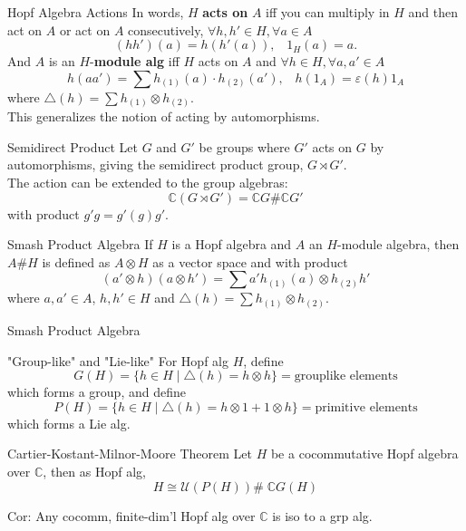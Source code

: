 \documentclass{beamer}
\newcommand\1{_{(1)}}
\newcommand\2{_{(2)}}
\begin{document}
\begin{frame}{Hopf Algebra Actions}
In words, $H$ \textbf{acts on} $A$ iff you can multiply in $H$ and then act on $A$ or act on $A$ consecutively, $\forall h,h'\in H,\forall a\in A$
\[
(hh')(a)=h(h'(a)),\;\;\; 1_H(a)=a. 
\]
And $A$ is an $H$-\textbf{module alg} iff $H$ acts on $A$ and $\forall h\in H,\forall a,a'\in A$
\[
h(aa')=\sum h\1(a)\cdot h\2(a'),\;\;\; h(1_A)=\varepsilon(h)1_A    
\]
where $\triangle(h)=\sum h\1\otimes h\2$.
\\ This generalizes the notion of acting by automorphisms.

\end{frame}

\begin{frame}{Semidirect Product}
    Let $G$ and $G'$ be groups where $G'$ acts on $G$ by automorphisms, giving the semidirect product group, $G\rtimes G'$.\\
    The action can be extended to the group algebras:
    \[
    \mathbb{C}(G\rtimes G')=\mathbb{C}G\#\mathbb{C}G'    
    \]
    with product $g'g=g'(g)g'$.\\
    \begin{block}{Smash Product Algebra}
        If $H$ is a Hopf algebra and $A$ an $H$-module algebra, then $A\#H$ is defined as $A\otimes H$ as a vector space and with product
        \[
        (a'\otimes h)(a\otimes h')=\sum a'h\1(a)\otimes h\2h' 
        \]
        where $a,a'\in A$, $h,h'\in H$ and $\triangle(h)=\sum h\1\otimes h\2$.
    \end{block}
\end{frame}

\begin{frame}{Smash Product Algebra}
    \begin{block}{"Group-like" and "Lie-like"}
        For Hopf alg $H$, define \[G(H)=\{h\in H\;\vert\; \triangle(h)=h\otimes h\}=\text{grouplike elements}\] 
        which forms a group, and define 
        \[P(H)=\{h\in H\;\vert\; \triangle(h)=h\otimes 1+1\otimes h\}=\text{primitive elements}\]
        which forms a Lie alg.
    \end{block}
    \begin{block}{Cartier-Kostant-Milnor-Moore Theorem}
        Let $H$ be a cocommutative Hopf algebra over $\mathbb{C}$, then as Hopf alg,
        \[
            H\cong \mathcal{U}\left(P(H)\right)\# \;\mathbb{C}G(H)
        \]
    \end{block}
    Cor: Any cocomm, finite-dim'l Hopf alg over $\mathbb{C}$ is iso to a grp alg.
\end{frame}
\end{document}
